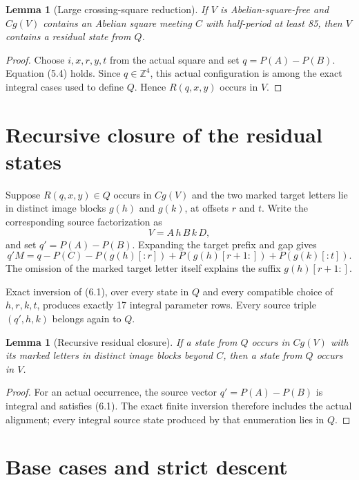 \documentclass[11pt]{article}
\newtheorem{lemma}[theorem]{Lemma}
\theoremstyle{definition}
\newcommand{\Par}{P}
\begin{document}
\begin{lemma}[Large crossing-square reduction]
If $V$ is Abelian-square-free and $Cg(V)$ contains an Abelian square meeting $C$ with half-period at least 85, then $V$ contains a residual state from $Q$.
\end{lemma}

\begin{proof}
Choose $i,x,r,y,t$ from the actual square and set $q=\Par(A)-\Par(B)$. Equation (5.4) holds. Since $q\in\mathbb Z^4$, this actual configuration is among the exact integral cases used to define $Q$. Hence $R(q,x,y)$ occurs in $V$.
\end{proof}

\section{Recursive closure of the residual states}

Suppose $R(q,x,y)\in Q$ occurs in $Cg(V)$ and the two marked target letters lie in distinct image blocks $g(h)$ and $g(k)$, at offsets $r$ and $t$. Write the corresponding source factorization as
\[
V=A\,h\,B\,k\,D,
\]
and set $q'=\Par(A)-\Par(B)$. Expanding the target prefix and gap gives
\[
q'M=
q-\Par(C)-\Par(g(h)[:r])+\Par(g(h)[r+1:])+\Par(g(k)[:t]).
\tag{6.1}
\]
The omission of the marked target letter itself explains the suffix $g(h)[r+1:]$.

Exact inversion of (6.1), over every state in $Q$ and every compatible choice of $h,r,k,t$, produces exactly 17 integral parameter rows. Every source triple $(q',h,k)$ belongs again to $Q$.

\begin{lemma}[Recursive residual closure]
If a state from $Q$ occurs in $Cg(V)$ with its marked letters in distinct image blocks beyond $C$, then a state from $Q$ occurs in $V$.
\end{lemma}

\begin{proof}
For an actual occurrence, the source vector $q'=\Par(A)-\Par(B)$ is integral and satisfies (6.1). The exact finite inversion therefore includes the actual alignment; every integral source state produced by that enumeration lies in $Q$.
\end{proof}

\section{Base cases and strict descent}
\end{document}
